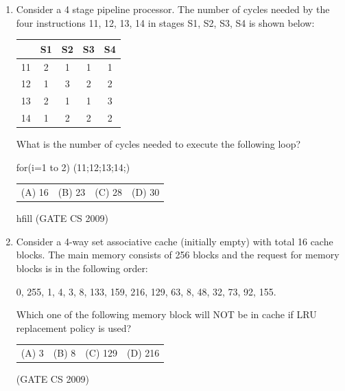\documentclass[a4paper, 11pt]{article}
\begin{document}
\begin{enumerate}
    \item Consider a 4 stage pipeline processor. The number of cycles needed by the four instructions 11, 12, 13, 14 in stages S1, S2, S3, S4 is shown below:\\
    \begin{center}
        \begin{tabular}{|c|c|c|c|c|}
    \hline
           & S1  & S2 & S3 & S4 \\
        \hline
        11  & 2  & 1 & 1 & 1 \\
        \hline
        12  & 1  & 3 & 2 & 2 \\
        \hline
        13  & 2  & 1 & 1 & 3 \\
        \hline
        14  & 1  & 2 & 2 & 2 \\
        \hline
    \end{tabular}
    \end{center}
    

        What is the number of cycles needed to execute the following loop?\\
        \begin{center}
        for(i=1 to 2) (11;12;13;14;)\\
        \end{center}
        \begin{tabularx}{\textwidth}{@{}XXXX@{}}
        (A) 16 & (B) 23 & (C) 28 & (D) 30
        \end{tabularx}

    hfill (GATE CS 2009)

    \item Consider a 4-way set associative cache (initially empty) with total 16 cache blocks. The main memory consists of 256 blocks and the request for memory blocks is in the following order:\\
    
    \begin{center}
        0, 255, 1, 4, 3, 8, 133, 159, 216, 129, 63, 8, 48, 32, 73, 92, 155.\\
    \end{center}
    
    Which one of the following memory block will NOT be in cache if LRU replacement policy is used?\\
    \begin{tabularx}{\textwidth}{@{}XXXX@{}}
    (A) 3 & (B) 8 & (C) 129 & (D) 216
    \end{tabularx}

    \hfill (GATE CS 2009)


\end{enumerate}
\end{document}
